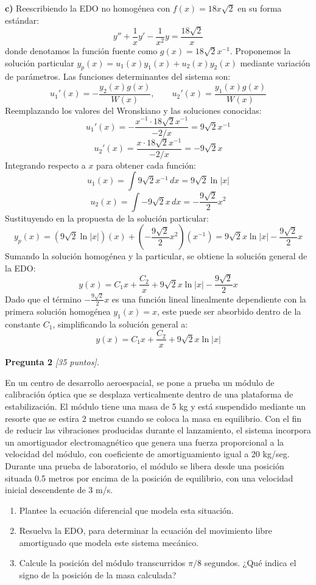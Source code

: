 \documentclass[12pt,letterpaper]{article}
\begin{document}
\medskip

\textbf{c)} Reescribiendo la EDO no homogénea con $f(x) = 18x\sqrt{2}$ en su forma estándar:
\[
  y'' + \frac{1}{x}y' - \frac{1}{x^2}y = \frac{18\sqrt{2}}{x}
\]
donde denotamos la función fuente como $g(x) = 18\sqrt{2}x^{-1}$. Proponemos la solución particular $y_p(x) = u_1(x)y_1(x) + u_2(x)y_2(x)$ mediante variación de parámetros. Las funciones determinantes del sistema son:
\[
  u_1'(x) = -\frac{y_2(x)g(x)}{W(x)}, \qquad u_2'(x) = \frac{y_1(x)g(x)}{W(x)}
\]
Reemplazando los valores del Wronskiano y las soluciones conocidas:
\[
  u_1'(x) = -\frac{x^{-1} \cdot 18\sqrt{2}x^{-1}}{-2/x} = 9\sqrt{2}x^{-1}
\]
\[
  u_2'(x) = \frac{x \cdot 18\sqrt{2}x^{-1}}{-2/x} = -9\sqrt{2}x
\]
Integrando respecto a $x$ para obtener cada función:
\[
  u_1(x) = \int 9\sqrt{2}x^{-1} \, dx = 9\sqrt{2}\ln|x|
\]
\[
  u_2(x) = \int -9\sqrt{2}x \, dx = -\frac{9\sqrt{2}}{2}x^2
\]
Sustituyendo en la propuesta de la solución particular:
\[
  y_p(x) = (9\sqrt{2}\ln|x|)(x) + \left(-\frac{9\sqrt{2}}{2}x^2\right)(x^{-1}) = 9\sqrt{2}x\ln|x| - \frac{9\sqrt{2}}{2}x
\]
Sumando la solución homogénea y la particular, se obtiene la solución general de la EDO:
\[
  y(x) = C_1 x + \frac{C_2}{x} + 9\sqrt{2}x\ln|x| - \frac{9\sqrt{2}}{2}x
\]
Dado que el término $-\frac{9\sqrt{2}}{2}x$ es una función lineal linealmente dependiente con la primera solución homogénea $y_1(x) = x$, este puede ser absorbido dentro de la constante $C_1$, simplificando la solución general a:
\[
  y(x) = C_1 x + \frac{C_2}{x} + 9\sqrt{2}x\ln|x|
\]

\bigskip

\textbf{Pregunta 2} \textit{[35 puntos].}

En un centro de desarrollo aeroespacial, se pone a prueba un módulo de calibración óptica que se desplaza verticalmente dentro de una plataforma de estabilización. El módulo tiene una masa de 5 kg y está suspendido mediante un resorte que se estira 2 metros cuando se coloca la masa en equilibrio. Con el fin de reducir las vibraciones producidas durante el lanzamiento, el sistema incorpora un amortiguador electromagnético que genera una fuerza proporcional a la velocidad del módulo, con coeficiente de amortiguamiento igual a 20 kg/seg.
Durante una prueba de laboratorio, el módulo se libera desde una posición situada 0.5 metros por encima de la posición de equilibrio, con una velocidad inicial descendente de 3 m/s.

\begin{enumerate}[label=\alph*)]
  \item Plantee la ecuación diferencial que modela esta situación.
  \item Resuelva la EDO, para determinar la ecuación del movimiento libre amortiguado que modela este sistema mecánico.
  \item Calcule la posición del módulo transcurridos $\pi/8$ segundos. ¿Qué indica el signo de la posición de la masa calculada?
\end{enumerate}
\end{document}
